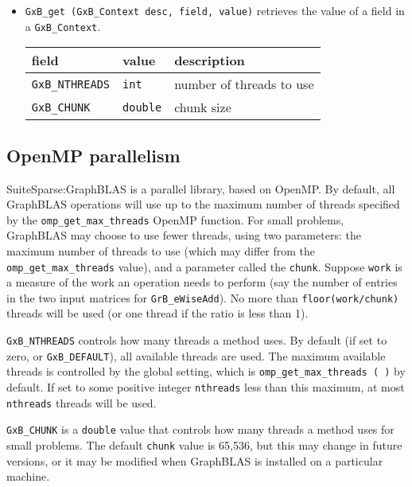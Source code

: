 \documentclass[12pt]{article}
\begin{document}
\begin{itemize}
\item \verb'GxB_get (GxB_Context desc, field, value)' retrieves
    the value of a field in a \verb'GxB_Context'.

{\footnotesize
\begin{tabular}{lll}
field                       & value         & description \\
\hline
\verb'GxB_NTHREADS'         & \verb'int'    & number of threads to use \\
\verb'GxB_CHUNK'            & \verb'double' & chunk size \\
\hline
\end{tabular}
}

\end{itemize}

\newpage
\subsection{OpenMP parallelism}
\label{omp_parallelism}

SuiteSparse:GraphBLAS is a parallel library, based on OpenMP.  By
default, all GraphBLAS operations will use up to the maximum number of threads
specified by the \verb'omp_get_max_threads' OpenMP function.  For small
problems, GraphBLAS may choose to use fewer threads, using two parameters: the
maximum number of threads to use (which may differ from the
\verb'omp_get_max_threads' value), and a parameter called the \verb'chunk'.
Suppose \verb'work' is a measure of the work an operation needs to perform (say
the number of entries in the two input matrices for \verb'GrB_eWiseAdd').  No
more than \verb'floor(work/chunk)' threads will be used (or one thread if the
ratio is less than 1).

\verb'GxB_NTHREADS' controls how many threads a method uses.
    By default (if set to zero, or \verb'GxB_DEFAULT'), all available threads
    are used.  The maximum available threads is controlled by the global
    setting, which is \verb'omp_get_max_threads ( )' by default.  If set to
    some positive integer \verb'nthreads' less than this maximum, at most
    \verb'nthreads' threads will be used.

\verb'GxB_CHUNK' is a \verb'double' value that controls how many threads
    a method uses for small problems.
The default \verb'chunk' value is 65,536, but this may change in future
versions, or it may be modified when GraphBLAS is installed on a particular
machine.
\end{document}
